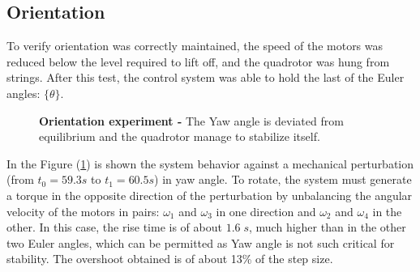 \documentclass[conference]{IEEEtran}
\newcommand{\refp}[1]{(\ref{#1})}
\begin{document}
\subsection{Orientation}
To verify orientation was correctly maintained, the speed of the motors was reduced below the level required to lift off, and the quadrotor was hung from strings. After this test, the control system was able to hold the last of the Euler angles: $\{\theta\}$. 
\begin{figure}[h!]
  \centering
   \hspace*{-5pt}
  \caption{\textbf{Orientation experiment -} The Yaw angle is deviated from equilibrium and the quadrotor manage to stabilize itself.}
  \label{fig:theta_all}
\end{figure}
In the Figure \refp{fig:theta_all} is shown the system behavior against a mechanical perturbation (from $t_0 = 59.3 s$ to $t_1 = 60.5 s$) in yaw angle. To rotate, the system must generate a torque in the opposite direction of the perturbation by unbalancing the angular velocity of the motors in pairs: $\omega_1$ and $\omega_3$ in one direction and $\omega_2$ and $\omega_4$ in the other. In this case, the rise time is of about $1.6\;s$, much higher than in the other two Euler angles, which can be permitted as Yaw angle is not such critical for stability. The overshoot obtained is of about 13\% of the step size. 
\end{document}
